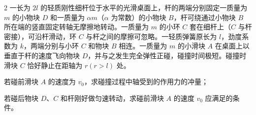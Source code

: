 \begin{problem}[第30届全国中学生物理竞赛复赛][刚体碰撞与转动]{2}
一长为 $2l$ 的轻质刚性细杆位于水平的光滑桌面上，杆的两端分别固定一质量为 $m$ 的小物块 $D$ 和一质量为 $\alpha m$（$\alpha$ 为常数）的小物块 $B$，杆可绕通过小物块 $B$ 所在端的竖直固定转轴无摩擦地转动。一质量为 $m$ 的小环 $C$ 套在细杆上（$C$ 与杆密接），可沿杆滑动，环 $C$ 与杆之间的摩擦可忽略。一轻质弹簧原长为 $l$，劲度系数为 $k$，两端分别与小环 $C$ 和物块 $B$ 相连。一质量为 $m$ 的小滑块 $A$ 在桌面上以垂直于杆的速度飞向物块 $D$，并与之发生完全弹性正碰，碰撞时间极短。碰撞时滑块 $C$ 恰好静止在距轴为 $r(r>l)$ 处。
\begin{subproblem}
若碰前滑块 $A$ 的速度为 $v_{0}$，求碰撞过程中轴受到的作用力的冲量；
\end{subproblem}
\begin{subproblem}
若碰后物块 $D$、$C$ 和杆刚好做匀速转动，求碰前滑块 $A$ 的速度 $v_{0}$ 应满足的条件。
\end{subproblem}
\end{problem}